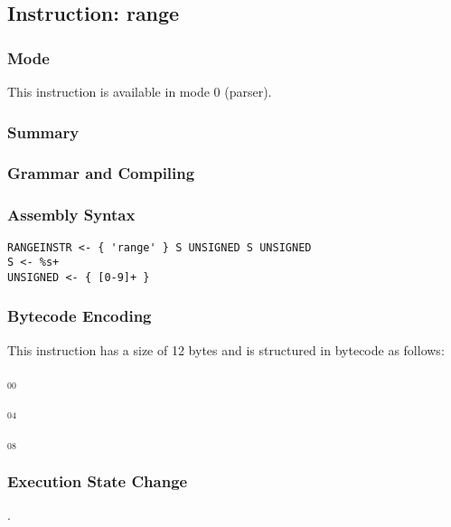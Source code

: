 \subsection{Instruction: range}

\subsubsection{Mode}
This instruction is available in mode 0 (parser).
\subsubsection{Summary}


\subsubsection{Grammar and Compiling}


\subsubsection{Assembly Syntax}

\begin{myquote}
\begin{verbatim}
RANGEINSTR <- { 'range' } S UNSIGNED S UNSIGNED
S <- %s+
UNSIGNED <- { [0-9]+ }
\end{verbatim}
\end{myquote}

\subsubsection{Bytecode Encoding}

This instruction has a size of 12 bytes and is structured in bytecode as follows:

$_{00}$\ 



$_{04}$\ 



$_{08}$\ 
\fbox{%
  \parbox{20pt}{%
00
  }%
}


\subsubsection{Execution State Change}

.


